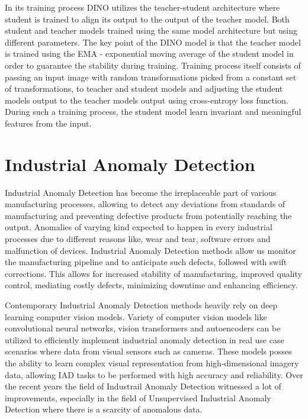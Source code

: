 In its training process DINO utilizes the teacher-student architecture where student is trained to align its output to the output of the teacher model. Both student and teacher models trained using the same model architecture but using different parameters. The key point of the DINO model is that the teacher model is trained using the EMA - exponential moving average of the student model in order to guarantee the stability during training. Training process itself consists of passing an input image with random transformations picked from a constant set of transformations, to teacher and student models and adjusting the student models output to the teacher models output using cross-entropy loss function. During such a training process, the student model learn invariant and meaningful features from the input.


\section{Industrial Anomaly Detection}
\label{iad}

Industrial Anomaly Detection has become the irreplaceable part of various manufacturing processes, allowing to detect any deviations from standards of manufacturing and preventing defective products from potentially reaching the output. Anomalies of varying kind expected to happen in every industrial processes due to different reasons like, wear and tear, software errors and malfunction of devices. Industrial Anomaly Detection methods allow us monitor the manufacturing pipeline and to anticipate such defects, followed with swift corrections. This allows for increased stability of manufacturing, improved quality control, mediating costly defects, minimizing downtime and enhancing efficiency.

Contemporary Industrial Anomaly Detection methods heavily rely on deep learning computer vision models. Variety of computer vision models like convolutional neural networks, vision transformers and autoencoders can be utilized to efficiently implement industrial anomaly detection in real use case scenarios where data from visual sensors such as cameras. These models posses the ability to learn complex visual representation from high-dimensional imagery data, allowing IAD tasks to be performed with high accuracy and reliability. Over the recent years the field of Industrail Anomaly Detection witnessed a lot of improvements, especially in the field of Unsupervised Industrial Anomaly Detection where there is a scarcity of anomalous data. 

